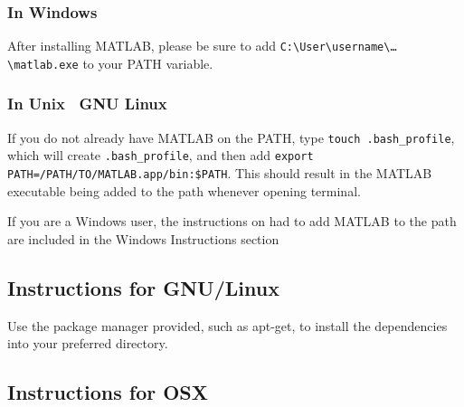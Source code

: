 \subsubsection*{In Windows}

After installing MATLAB, please be sure to add \texttt{C:\textbackslash{User}\textbackslash{username}\textbackslash{\ldots}\textbackslash{matlab.exe}} to your PATH variable. 


\subsubsection*{In Unix \ GNU Linux}

If you do not already have MATLAB on the PATH, type \texttt{touch .bash\_profile}, which will create \texttt{.bash\_profile}, and then add \texttt{export PATH=/PATH/TO/MATLAB.app/bin:\$PATH}. This should result in the MATLAB executable being added to the path whenever opening terminal. 

If you are a Windows user, the instructions on had to add MATLAB to the \gls{path} are included in the Windows Instructions section


	\subsection{Instructions for GNU/Linux}

Use the package manager provided, such as apt-get, to install the dependencies into your preferred directory.

	\subsection{Instructions for OSX}

